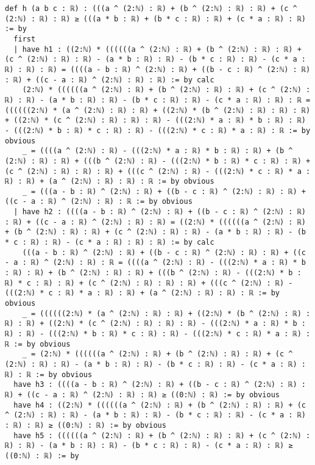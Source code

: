 \documentclass{article}
\begin{document}
\begin{tcolorbox}[colback=white!10, width=\linewidth]
\begin{lstlisting}[language=Lean4]
def h (a b c : ℝ) : (((a ^ (2:ℕ) : ℝ) + (b ^ (2:ℕ) : ℝ) : ℝ) + (c ^ (2:ℕ) : ℝ) : ℝ) ≥ (((a * b : ℝ) + (b * c : ℝ) : ℝ) + (c * a : ℝ) : ℝ) := by
  first
  | have h1 : ((2:ℕ) * ((((((a ^ (2:ℕ) : ℝ) + (b ^ (2:ℕ) : ℝ) : ℝ) + (c ^ (2:ℕ) : ℝ) : ℝ) - (a * b : ℝ) : ℝ) - (b * c : ℝ) : ℝ) - (c * a : ℝ) : ℝ) : ℝ) = ((((a - b : ℝ) ^ (2:ℕ) : ℝ) + ((b - c : ℝ) ^ (2:ℕ) : ℝ) : ℝ) + ((c - a : ℝ) ^ (2:ℕ) : ℝ) : ℝ) := by calc
    (2:ℕ) * ((((((a ^ (2:ℕ) : ℝ) + (b ^ (2:ℕ) : ℝ) : ℝ) + (c ^ (2:ℕ) : ℝ) : ℝ) - (a * b : ℝ) : ℝ) - (b * c : ℝ) : ℝ) - (c * a : ℝ) : ℝ) : ℝ = ((((((2:ℕ) * (a ^ (2:ℕ) : ℝ) : ℝ) + ((2:ℕ) * (b ^ (2:ℕ) : ℝ) : ℝ) : ℝ) + ((2:ℕ) * (c ^ (2:ℕ) : ℝ) : ℝ) : ℝ) - (((2:ℕ) * a : ℝ) * b : ℝ) : ℝ) - (((2:ℕ) * b : ℝ) * c : ℝ) : ℝ) - (((2:ℕ) * c : ℝ) * a : ℝ) : ℝ := by obvious
    _ = ((((a ^ (2:ℕ) : ℝ) - (((2:ℕ) * a : ℝ) * b : ℝ) : ℝ) + (b ^ (2:ℕ) : ℝ) : ℝ) + (((b ^ (2:ℕ) : ℝ) - (((2:ℕ) * b : ℝ) * c : ℝ) : ℝ) + (c ^ (2:ℕ) : ℝ) : ℝ) : ℝ) + (((c ^ (2:ℕ) : ℝ) - (((2:ℕ) * c : ℝ) * a : ℝ) : ℝ) + (a ^ (2:ℕ) : ℝ) : ℝ) : ℝ := by obvious
    _ = (((a - b : ℝ) ^ (2:ℕ) : ℝ) + ((b - c : ℝ) ^ (2:ℕ) : ℝ) : ℝ) + ((c - a : ℝ) ^ (2:ℕ) : ℝ) : ℝ := by obvious
  | have h2 : ((((a - b : ℝ) ^ (2:ℕ) : ℝ) + ((b - c : ℝ) ^ (2:ℕ) : ℝ) : ℝ) + ((c - a : ℝ) ^ (2:ℕ) : ℝ) : ℝ) = ((2:ℕ) * ((((((a ^ (2:ℕ) : ℝ) + (b ^ (2:ℕ) : ℝ) : ℝ) + (c ^ (2:ℕ) : ℝ) : ℝ) - (a * b : ℝ) : ℝ) - (b * c : ℝ) : ℝ) - (c * a : ℝ) : ℝ) : ℝ) := by calc
    (((a - b : ℝ) ^ (2:ℕ) : ℝ) + ((b - c : ℝ) ^ (2:ℕ) : ℝ) : ℝ) + ((c - a : ℝ) ^ (2:ℕ) : ℝ) : ℝ = ((((a ^ (2:ℕ) : ℝ) - (((2:ℕ) * a : ℝ) * b : ℝ) : ℝ) + (b ^ (2:ℕ) : ℝ) : ℝ) + (((b ^ (2:ℕ) : ℝ) - (((2:ℕ) * b : ℝ) * c : ℝ) : ℝ) + (c ^ (2:ℕ) : ℝ) : ℝ) : ℝ) + (((c ^ (2:ℕ) : ℝ) - (((2:ℕ) * c : ℝ) * a : ℝ) : ℝ) + (a ^ (2:ℕ) : ℝ) : ℝ) : ℝ := by obvious
    _ = ((((((2:ℕ) * (a ^ (2:ℕ) : ℝ) : ℝ) + ((2:ℕ) * (b ^ (2:ℕ) : ℝ) : ℝ) : ℝ) + ((2:ℕ) * (c ^ (2:ℕ) : ℝ) : ℝ) : ℝ) - (((2:ℕ) * a : ℝ) * b : ℝ) : ℝ) - (((2:ℕ) * b : ℝ) * c : ℝ) : ℝ) - (((2:ℕ) * c : ℝ) * a : ℝ) : ℝ := by obvious
    _ = (2:ℕ) * ((((((a ^ (2:ℕ) : ℝ) + (b ^ (2:ℕ) : ℝ) : ℝ) + (c ^ (2:ℕ) : ℝ) : ℝ) - (a * b : ℝ) : ℝ) - (b * c : ℝ) : ℝ) - (c * a : ℝ) : ℝ) : ℝ := by obvious
  have h3 : ((((a - b : ℝ) ^ (2:ℕ) : ℝ) + ((b - c : ℝ) ^ (2:ℕ) : ℝ) : ℝ) + ((c - a : ℝ) ^ (2:ℕ) : ℝ) : ℝ) ≥ ((0:ℕ) : ℝ) := by obvious
  have h4 : ((2:ℕ) * ((((((a ^ (2:ℕ) : ℝ) + (b ^ (2:ℕ) : ℝ) : ℝ) + (c ^ (2:ℕ) : ℝ) : ℝ) - (a * b : ℝ) : ℝ) - (b * c : ℝ) : ℝ) - (c * a : ℝ) : ℝ) : ℝ) ≥ ((0:ℕ) : ℝ) := by obvious
  have h5 : ((((((a ^ (2:ℕ) : ℝ) + (b ^ (2:ℕ) : ℝ) : ℝ) + (c ^ (2:ℕ) : ℝ) : ℝ) - (a * b : ℝ) : ℝ) - (b * c : ℝ) : ℝ) - (c * a : ℝ) : ℝ) ≥ ((0:ℕ) : ℝ) := by

\end{lstlisting}
\end{tcolorbox}
\end{document}
